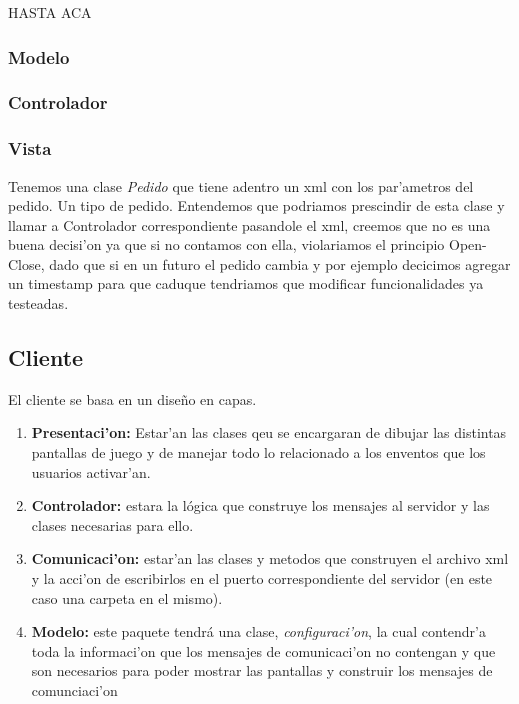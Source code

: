 \todo HASTA ACA

\subsubsection{Modelo}

\subsubsection{Controlador}

\subsubsection{Vista}

Tenemos una clase \textit{Pedido} que tiene adentro un xml con los par'ametros del pedido. Un tipo de pedido.
Entendemos que podriamos prescindir de esta clase y llamar a Controlador correspondiente pasandole el xml,
creemos que no es una buena decisi'on ya que si no contamos con ella, violariamos el principio Open-Close, dado 
que si en un futuro el pedido cambia y por ejemplo decicimos agregar un timestamp para que caduque tendriamos que 
modificar funcionalidades ya testeadas.

\subsection{Cliente}

El cliente se basa en un diseño en capas.


\begin{enumerate}
	\item \textbf{Presentaci'on: }Estar'an las clases qeu se encargaran de dibujar las distintas pantallas de juego y de manejar todo lo relacionado a los enventos que los usuarios activar'an.
	\item \textbf{Controlador: } estara la lógica que construye los mensajes al servidor y las clases necesarias para ello.
	\item \textbf{Comunicaci'on:} estar'an las clases y metodos que construyen el archivo xml y la acci'on de escribirlos en el puerto correspondiente del servidor (en este caso una carpeta en el mismo).
	\item  \textbf{Modelo:} este paquete tendrá una clase, \textit{configuraci'on}, la cual contendr'a toda la informaci'on que los mensajes de comunicaci'on no contengan y que son necesarios para poder mostrar las pantallas y construir los mensajes de comunciaci'on
 \end{enumerate}

